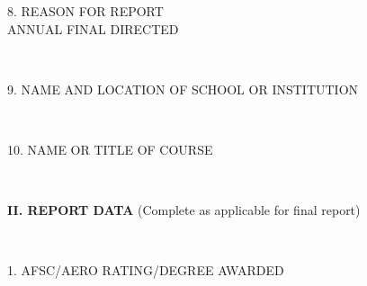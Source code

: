 \documentclass{article}
\begin{document}
\parbox[][\rhVII][c]{0.3\textwidth}{

8. REASON FOR REPORT\\[5pt]
\hspace{5pt}
\hspace{5pt} \small ANNUAL \hspace{5pt}
\hspace{5pt} \small FINAL \hspace{5pt}
\hspace{5pt} \small DIRECTED 
}\\
\hline
\parbox[][\rhVIII][c]{\textwidth}{

9. NAME AND LOCATION OF SCHOOL OR INSTITUTION\\[1pt]
}\\
\hline
\parbox[][\rhIX][c]{\textwidth}{

10. NAME OR TITLE OF COURSE\\[1pt]
}\\
\hline
\parbox[][\rhX][c]{\textwidth}{

\textbf{II. REPORT DATA} (Complete as applicable for final report)
}\\
\hline
\parbox[][\rhXI][c]{0.5\textwidth}{

1. AFSC/AERO RATING/DEGREE AWARDED\\[5pt]
}\vrule\hspace{5pt}
\end{document}

